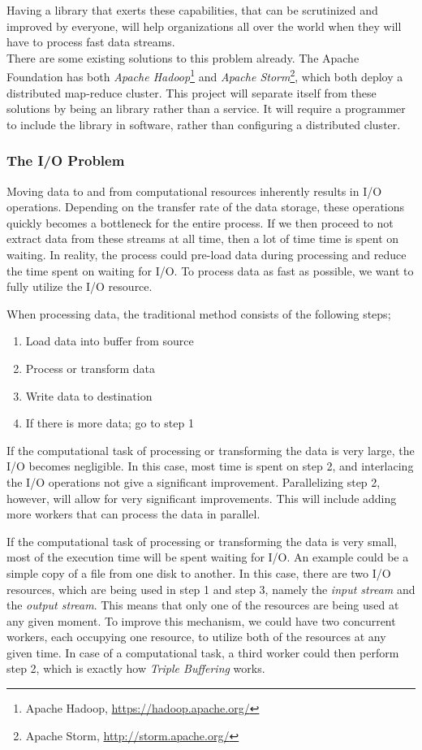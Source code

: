 \documentclass[a4paper]{article}
\begin{document}
Having a library that exerts these capabilities, that can be scrutinized and improved by everyone, will help organizations all over the world when they will have to process fast data streams.\\

There are some existing solutions to this problem already. The Apache Foundation has both \textit{Apache Hadoop}\footnote{Apache Hadoop, \url{https://hadoop.apache.org/}} and \textit{Apache Storm}\footnote{Apache Storm, \url{http://storm.apache.org/}}, which both deploy a distributed map-reduce cluster. This project will separate itself from these solutions by being an library rather than a service. It will require a programmer to include the library in software, rather than configuring a distributed cluster.


\subsubsection{The I/O Problem}
Moving data to and from computational resources inherently results in I/O operations. Depending on the transfer rate of the data storage, these operations quickly becomes a bottleneck for the entire process. If we then proceed to not extract data from these streams at all time, then a lot of time time is spent on waiting. In reality, the process could pre-load data during processing and reduce the time spent on waiting for I/O. To process data as fast as possible, we want to fully utilize the I/O resource. 

When processing data, the traditional method consists of the following steps;

\begin{enumerate}
\item Load data into buffer from source
\item Process or transform data
\item Write data to destination
\item If there is more data; go to step 1
\end{enumerate}

If the computational task of processing or transforming the data is very large, the I/O becomes negligible. In this case, most time is spent on step 2, and interlacing the I/O operations not give a significant improvement. Parallelizing step 2, however, will allow for very significant improvements. This will include adding more workers that can process the data in parallel.

If the computational task of processing or transforming the data is very small, most of the execution time will be spent waiting for I/O. An example could be a simple copy of a file from one disk to another. In this case, there are two I/O resources, which are being used in step 1 and step 3, namely the \textit{input stream} and the \textit{output stream}. This means that only one of the resources are being used at any given moment. To improve this mechanism, we could have two concurrent workers, each occupying one resource, to utilize both of the resources at any given time. In case of a computational task, a third worker could then perform step 2, which is exactly how \textit{Triple Buffering} works.\\
\end{document}
